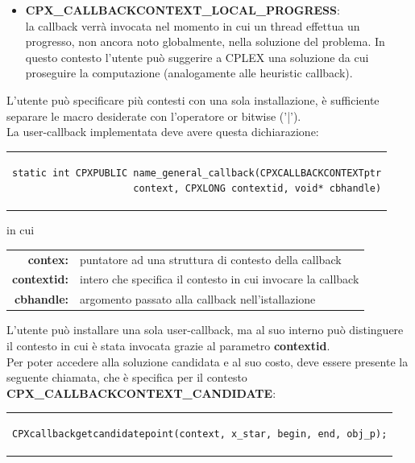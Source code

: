 \begin{center}
\begin{center}
\begin{itemize}
\item{\textbf{CPX\_CALLBACKCONTEXT\_LOCAL\_PROGRESS}: \\la callback verrà invocata nel momento in cui un thread effettua un progresso, non ancora noto globalmente, nella soluzione del problema. In questo contesto l'utente può suggerire a CPLEX una soluzione da cui proseguire la computazione (analogamente alle heuristic callback).}\\
\end{itemize}
L'utente può specificare più contesti con una sola installazione, è sufficiente separare le macro desiderate con l'operatore or bitwise ('|').\\
La user-callback implementata deve avere questa dichiarazione:
\begin{center}
\begin{tabular}{c}
\begin{lstlisting}[linewidth=382pt, basicstyle=\footnotesize\sffamily,]    
static int CPXPUBLIC name_general_callback(CPXCALLBACKCONTEXTptr
                     context, CPXLONG contextid, void* cbhandle)
\end{lstlisting}
\end{tabular}
\end{center}
in cui
\begin{table}[h]
\centering
\begin{tabular}{rl}
\textbf{contex:} & {puntatore ad una struttura di contesto della callback}\\
\textbf{contextid:} & {intero che specifica il contesto in cui invocare la callback}\\
\textbf{cbhandle:} & {argomento passato alla callback nell'istallazione}\\
\end{tabular}
\end{table}
L'utente può installare una sola user-callback, ma al suo interno può distinguere il contesto in cui è stata invocata grazie al parametro \textbf{contextid}.\\
Per poter accedere alla soluzione candidata e al suo costo, deve essere presente la seguente chiamata, che è specifica per il contesto \textbf{CPX\_CALLBACKCONTEXT\_CANDIDATE}:
\begin{center}
\begin{tabular}{c}
\begin{lstlisting}[linewidth=385pt, basicstyle=\footnotesize\sffamily,]    
CPXcallbackgetcandidatepoint(context, x_star, begin, end, obj_p);

\end{lstlisting}
\end{tabular}
\end{center}
\end{center}
\end{center}
